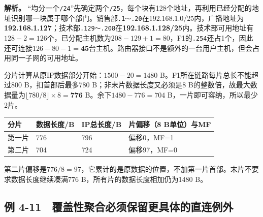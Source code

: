 \textbf{解析。} ``均分一个\texttt{/\allowbreak{}24}''先确定两个\texttt{/\allowbreak{}25}，每个块有128个地址，再利用已经分配的地址识别哪一块属于哪个部门。销售部\texttt{.1～.20}在192.168.1.0/25内，广播地址为\textbf{192.168.1.127}；技术部\texttt{.129～.208}在\textbf{192.168.1.128/25}内。技术部可用地址有\(128-2=126\)个，已分配主机数为\(208-129+1=80\)，F1的\texttt{.254}还占1个，因此还可连接\(126-80-1=\mathbf{45}\)台主机。路由器接口不是额外的一台用户主机，但会占用同一子网的可用地址。

分片计算从原IP数据部分开始：\(1500-20=1480\) B。F1所在链路每片总长不能超过800 B，扣首部后最多780 B；非末片数据长度又必须是8 B的整数倍，故最大数据量为\(\lfloor780/8\rfloor\times8=\mathbf{776}\) B。余下\(1480-776=704\) B，一片即可容纳，所以最少2片。

\begin{wideblock}

\par\medskip\noindent\begin{minipage}{\linewidth}\fontsize{9.3}{12}\selectfont\begin{tabularx}{\linewidth}{@{}YYYY@{}}
\toprule\noalign{}
分片 & 数据长度/B & IP总长度/B & 片偏移（8 B单位）与MF \\
\midrule\noalign{}


第一片 & 776 & 796 & 偏移0，MF=1 \\
第二片 & 704 & 724 & 偏移97，MF=0 \\
\bottomrule\end{tabularx}
\end{minipage}\par\medskip

\end{wideblock}

第二片偏移是\(776/8=97\)，它累计的是原数据的位置，不加第一片首部。末片不要求数据长度继续凑满776 B，所有片的数据长度相加仍为1480 B。

\subsection{例 4-11　覆盖性聚合必须保留更具体的直连例外}\label{CN04-ex11}

